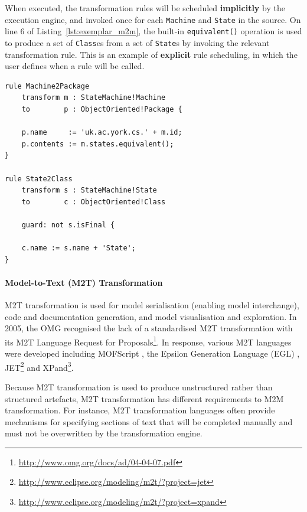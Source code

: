 When executed, the transformation rules will be scheduled \textbf{implicitly} by the execution engine, and invoked once for each \texttt{Machine} and \texttt{State} in the source. On line 6 of Listing~\ref{lst:exemplar_m2m}, the built-in \texttt{equivalent()} operation is used to produce a set of \texttt{Class}es from a set of \texttt{State}s by invoking the relevant transformation rule. This is an example of \textbf{explicit} rule scheduling, in which the user defines when a rule will be called.

\begin{lstlisting}[caption={[M2M transformation in ETL]M2M transformation in the Epsilon Transformation Language \cite{kolovos08etl}}, label=lst:exemplar_m2m, language=ETL]
rule Machine2Package
	transform m : StateMachine!Machine
	to        p : ObjectOriented!Package {
		
	p.name     := 'uk.ac.york.cs.' + m.id;
	p.contents := m.states.equivalent();
}

rule State2Class
	transform s : StateMachine!State
	to        c : ObjectOriented!Class 
	
	guard: not s.isFinal {
		
	c.name := s.name + 'State';
}
\end{lstlisting}


\paragraph{Model-to-Text (M2T) Transformation} M2T transformation is used for model serialisation (enabling model interchange), code and documentation generation, and model visualisation and exploration.  In 2005, the OMG recognised the lack of a standardised M2T transformation with its M2T Language Request for Proposals\footnote{\url{http://www.omg.org/docs/ad/04-04-07.pdf}}. In response, various M2T languages were developed including MOFScript \cite{oldevik05toward}, the Epsilon Generation Language (EGL) \cite{rose08egl}, JET\footnote{\url{http://www.eclipse.org/modeling/m2t/?project=jet}} and XPand\footnote{\url{http://www.eclipse.org/modeling/m2t/?project=xpand}}.

Because M2T transformation is used to produce unstructured rather than structured artefacts, M2T transformation has different requirements to M2M transformation. For instance, M2T transformation languages often provide mechanisms for specifying sections of text that will be completed manually and must not be overwritten by the transformation engine.

